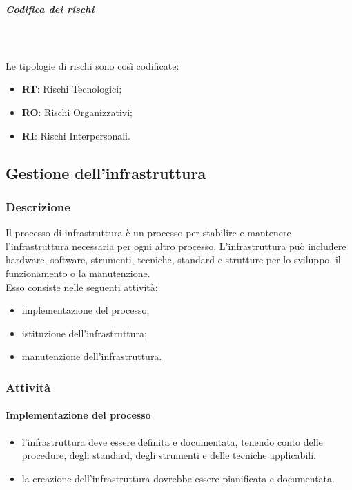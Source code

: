 			\noindent
			\subparagraph{Codifica dei rischi} \mbox{}\\ \mbox{}\\
				Le tipologie di rischi sono così codificate:
				\begin{itemize}
					\item \textbf{RT}: Rischi Tecnologici;
					\item \textbf{RO}: Rischi Organizzativi;
					\item \textbf{RI}: Rischi Interpersonali.
				\end{itemize}

		
		
		
		\subsection{Gestione dell'infrastruttura}
		\subsubsection{Descrizione}
		Il processo di infrastruttura è un processo per stabilire e mantenere l'infrastruttura necessaria per ogni altro processo. L'infrastruttura può includere hardware, software, strumenti, tecniche, standard e strutture per lo sviluppo, il funzionamento o la manutenzione. \\
		Esso consiste nelle seguenti attività:
		\begin{itemize}
			\item implementazione del processo;
			\item istituzione dell'infrastruttura;
			\item manutenzione dell'infrastruttura.
		\end{itemize}
		
		\subsubsection{Attività}
		\paragraph{Implementazione del processo}
		\begin{itemize}
			\item l'infrastruttura deve essere definita e documentata, tenendo conto delle procedure, degli standard, degli strumenti e delle tecniche applicabili.
			\item  la creazione dell'infrastruttura dovrebbe essere pianificata e documentata.
		\end{itemize}
